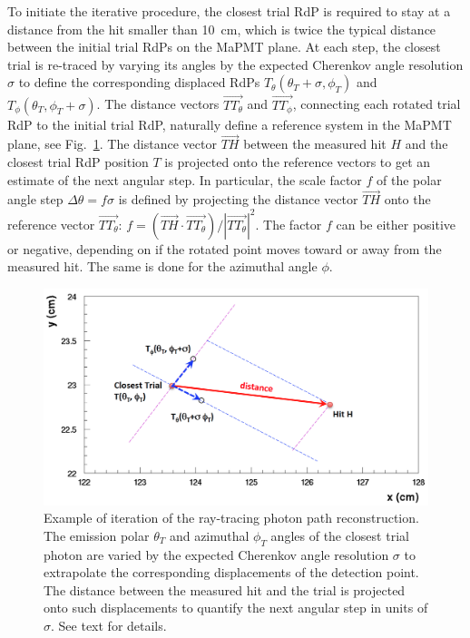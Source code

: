 To initiate the iterative procedure, the closest trial RdP is required to stay at a distance from the hit smaller than
10~cm, which is twice the typical distance between the initial trial RdPs on the MaPMT plane. At each step, the
closest trial is re-traced by varying its angles by the expected Cherenkov angle resolution $\sigma$ to define the
corresponding displaced RdPs $T_{\theta} (\theta_T + \sigma, \phi_T)$ and $T_{\phi}(\theta_T, \phi_T + \sigma)$.
The distance vectors $\overrightarrow{TT_\theta}$ and $\overrightarrow{TT_\phi}$, connecting each rotated trial
RdP to the initial trial RdP, naturally define a reference system in the MaPMT plane, see Fig.~\ref{Fig:RayAlgo}. The
distance vector $\overrightarrow{TH}$ between the measured hit $H$ and the closest trial RdP position $T$ is
projected onto the reference vectors to get an estimate of the next angular step. In particular, the scale factor
$f$ of the polar angle step $\Delta \theta = f \sigma$ is defined by projecting the distance vector
$\overrightarrow{TH}$ onto the reference vector $\overrightarrow{TT_\theta}$:
$f=(\overrightarrow{TH} \cdot \overrightarrow{TT_\theta}) / |\overrightarrow{TT_\theta}|^2$. The factor $f$ can
be either positive or negative, depending on if the rotated point moves toward or away from the measured hit. The
same is done for the azimuthal angle $\phi$. 

\begin{figure}[t]
\begin{center}
\includegraphics[width=1.0\columnwidth]{pics/ray_trace_example.png}
\end{center}
\caption{Example of iteration of the ray-tracing photon path reconstruction. The emission polar $\theta_T$ and
  azimuthal $\phi_T$ angles of the closest trial photon are varied by the expected Cherenkov angle resolution
  $\sigma$ to extrapolate the corresponding displacements of the detection point. The distance between the
  measured hit and the trial is projected onto such displacements to quantify the next angular step in units of
  $\sigma$. See text for details.}
\label{Fig:RayAlgo}
\end{figure}

